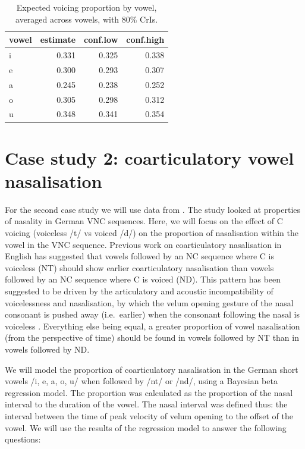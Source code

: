 \documentclass[
  authoryear,
  preprint,
  3p]{elsarticle}
\begin{document}
\begin{longtable}[]{@{}lrrr@{}}

\caption{\label{tbl-marginal-2}Expected voicing proportion by vowel,
averaged across vowels, with 80\% CrIs.}

\tabularnewline

\toprule\noalign{}
vowel & estimate & conf.low & conf.high \\
\midrule\noalign{}
\endhead
\bottomrule\noalign{}
\endlastfoot
i & 0.331 & 0.325 & 0.338 \\
e & 0.300 & 0.293 & 0.307 \\
a & 0.245 & 0.238 & 0.252 \\
o & 0.305 & 0.298 & 0.312 \\
u & 0.348 & 0.341 & 0.354 \\

\end{longtable}

\section{Case study 2: coarticulatory vowel
nasalisation}\label{sec-case-2}

For the second case study we will use data from \citet{carignan2021}.
The study looked at properties of nasality in German VNC sequences.
Here, we will focus on the effect of C voicing (voiceless /t/ vs voiced
/d/) on the proportion of nasalisation within the vowel in the VNC
sequence. Previous work on coarticulatory nasalisation in English has
suggested that vowels followed by an NC sequence where C is voiceless
(NT) should show earlier coarticulatory nasalisation than vowels
followed by an NC sequence where C is voiced (ND). This pattern has been
suggested to be driven by the articulatory and acoustic incompatibility
of voicelessness and nasalisation, by which the velum opening gesture of
the nasal consonant is pushed away (i.e.~earlier) when the consonant
following the nasal is voiceless
\citep{fowler2005, beddor2009, cho2017, carignan2015}. Everything else
being equal, a greater proportion of vowel nasalisation (from the
perspective of time) should be found in vowels followed by NT than in
vowels followed by ND.

We will model the proportion of coarticulatory nasalisation in the
German short vowels /i, e, a, o, u/ when followed by /nt/ or /nd/, using
a Bayesian beta regression model. The proportion was calculated as the
proportion of the nasal interval to the duration of the vowel. The nasal
interval was defined thus: the interval between the time of peak
velocity of velum opening to the offset of the vowel. We will use the
results of the regression model to answer the following questions:
\end{document}
